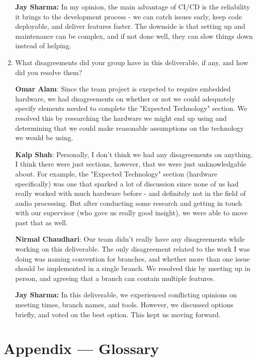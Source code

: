 \documentclass{article}
\begin{document}
\begin{enumerate}
    \textbf{Jay Sharma:} In my opinion, the main advantage of CI/CD is the reliability it brings to the development process - we can catch issues early, keep code deployable, 
    and deliver features faster. The downside is that setting up and maintenance can be complex, and if not done well, they can slow things down instead of helping.
     
    \item What disagreements did your group have in this deliverable, if any,
    and how did you resolve them?

    \textbf{Omar Alam}: Since the team project is exepcted to require embedded hardware, we had disagreements on whether or not we could adequately
    specify elements needed to complete the "Expected Technology" section. We resolved this by researching the hardware we might end up using and 
    determining that we could make reasonable assumptions on the technology we would be using.

    \textbf{Kalp Shah}: Personally, I don't think we had any disagreements on anything. I think there were just sections, however, that we were just
    unknowledgable about. For example, the "Expected Technology" section (hardware specifically) was one that sparked a lot of discussion since none
    of us had really worked with much hardware before - and definitely not in the field of audio processing. But after conducting some research
    and getting in touch with our supervisor (who gave us really good insight), we were able to move past that as well. 
    
    \textbf{Nirmal Chaudhari}: Our team didn't really have any disagreements while working on this deliverable. 
    The only disagreement related to the work I was doing was naming convention for branches, and whether more than one issue should be implemented in a single branch. 
    We resolved this by meeting up in person, and agreeing that a branch can contain multiple features. 
    
    \textbf{Jay Sharma:} In this deliverable, we experienced conflicting opinions on meeting times, branch names, and tools.
    However, we discussed options briefly, and voted on the best option. This kept us moving forward.
\end{enumerate}

\newpage{}

\section*{Appendix --- Glossary}
\end{document}
